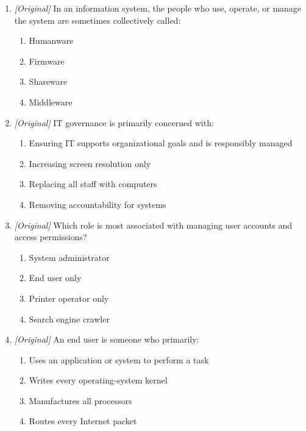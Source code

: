 \begin{enumerate}[label=\textbf{Q\arabic*.}, leftmargin=*]
\begin{enumerate}[label=\Alph*.]
    \item Trained staff reduce security mistakes.
    \item Hardware alone guarantees good governance.
  \end{enumerate}
\item \textit{[Original]} In an information system, the people who use, operate, or manage the system are sometimes collectively called:
  \begin{enumerate}[label=\Alph*.]
\item Humanware
   \item Firmware
   \item Shareware
   \item Middleware
  \end{enumerate}

\item \textit{[Original]} IT governance is primarily concerned with:
  \begin{enumerate}[label=\Alph*.]
\item Ensuring IT supports organizational goals and is responsibly managed
   \item Increasing screen resolution only
   \item Replacing all staff with computers
   \item Removing accountability for systems
  \end{enumerate}

\item \textit{[Original]} Which role is most associated with managing user accounts and access permissions?
  \begin{enumerate}[label=\Alph*.]
\item System administrator
   \item End user only
   \item Printer operator only
   \item Search engine crawler
  \end{enumerate}

\item \textit{[Original]} An end user is someone who primarily:
  \begin{enumerate}[label=\Alph*.]
\item Uses an application or system to perform a task
   \item Writes every operating-system kernel
   \item Manufactures all processors
   \item Routes every Internet packet
  \end{enumerate}


\end{enumerate}
